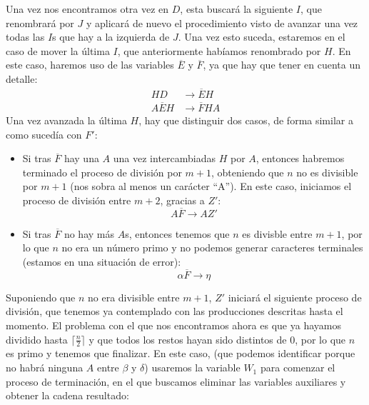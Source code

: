 \begin{ejercicio}
\begin{enumerate}
        Una vez nos encontramos otra vez en $D$, esta buscará la siguiente $I$, que renombrará por $J$ y aplicará de nuevo el procedimiento visto de avanzar una vez todas las $I$s que hay a la izquierda de $J$. Una vez esto suceda, estaremos en el caso de mover la última $I$, que anteriormente habíamos renombrado por $H$. En este caso, haremos uso de las variables $\overline{E}$ y $\overline{F}$, ya que hay que tener en cuenta un detalle:
        \begin{align*}
            HD &\rightarrow \overline{E}H \\
            A\overline{E}H &\rightarrow \overline{F}HA
        \end{align*}
        Una vez avanzada la última $H$, hay que distinguir dos casos, de forma similar a como sucedía con $F'$:
        \begin{itemize}
            \item Si tras $\overline{F}$ hay una $A$ una vez intercambiadas $H$ por $A$, entonces habremos terminado el proceso de división por $m+1$, obteniendo que $n$ no es divisible por $m+1$ (nos sobra al menos un carácter ``A''). En este caso, iniciamos el proceso de división entre $m+2$, gracias a $Z'$:
                \begin{equation*}
                    A\overline{F} \rightarrow AZ'
                \end{equation*}
            \item Si tras $\overline{F}$ no hay más $A$s, entonces tenemos que $n$ es divisble entre $m+1$, por lo que $n$ no era un número primo y no podemos generar caracteres terminales (estamos en una situación de error):
                \begin{equation*}
                    \alpha\overline{F} \rightarrow \eta
                \end{equation*}
        \end{itemize}
        Suponiendo que $n$ no era divisible entre $m+1$, $Z'$ iniciará el siguiente proceso de división, que tenemos ya contemplado con las producciones descritas hasta el momento. El problema con el que nos encontramos ahora es que ya hayamos dividido hasta $\lceil \frac{n}{2}\rceil$ y que todos los restos hayan sido distintos de 0, por lo que $n$ es primo y tenemos que finalizar. En este caso, (que podemos identificar porque no habrá ninguna $A$ entre $\beta$ y $\delta$) usaremos la variable $W_1$ para comenzar el proceso de terminación, en el que buscamos eliminar las variables auxiliares y obtener la cadena resultado:
        \begin{equation*}

\end{equation*}
\end{enumerate}
\end{ejercicio}
